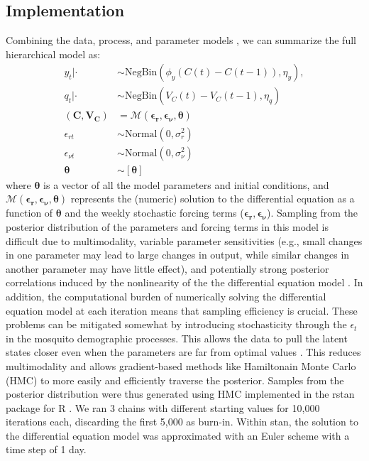 \documentclass[10pt,letterpaper]{article}
\begin{document}
\subsection*{Implementation}

Combining the data, process, and parameter models \cite{Berliner1996}, we can summarize the full hierarchical model as:
\begin{align}
y_t | \cdot & \sim \text{NegBin}(\phi_y (C(t) - C(t-1)), \eta_y),
\\
q_t | \cdot &\sim \text{NegBin}(V_{C}(t) - V_{C}(t-1), \eta_q)\\
(\mathbf{C}, \mathbf{V_C}) & = \mathcal{M}(\boldsymbol{\epsilon_r}, \boldsymbol{\epsilon_{\nu}},\boldsymbol{\theta})\\
\epsilon_{rt} & \sim \text{Normal}(0, \sigma^2_r)\\
\epsilon_{\nu t} & \sim \text{Normal}(0, \sigma^2_{\nu})\\
\boldsymbol{\theta} & \sim [\boldsymbol{\theta}]
\end{align}
where $\boldsymbol{\theta}$ is a vector of all the model parameters and initial conditions, and $\mathcal{M}(\boldsymbol{\epsilon_r}, \boldsymbol{\epsilon_{\nu}},\boldsymbol{\theta})$ represents the (numeric) solution to the differential equation as a function of $\boldsymbol{\theta}$ and the weekly stochastic forcing terms ($\boldsymbol{\epsilon_{r}}, \boldsymbol{\epsilon_{\nu}}$).
Sampling from the posterior distribution of the parameters and forcing terms in this model is difficult due to multimodality, variable parameter sensitivities (e.g., small changes in one parameter may lead to large changes in output, while similar changes in another parameter may have little effect), and potentially strong posterior correlations induced by the nonlinearity of the the differential equation model \cite{Reilly2005, Girolami2008, Calderhead2011}.
In addition, the computational burden of numerically solving the differential equation model at each iteration means that sampling efficiency is crucial.
These problems can be mitigated somewhat by introducing stochasticity through the $\epsilon_t$ in the mosquito demographic processes.
This allows the data to pull the latent states closer even when the parameters are far from optimal values \cite{Leander2014}.
This reduces multimodality and allows gradient-based methods like Hamiltonain Monte Carlo (HMC) to more easily and efficiently traverse the posterior.
Samples from the posterior distribution were thus generated using HMC implemented in the rstan package \cite{Carpenter2016, Rstan2017} for R \cite{R2016}. 
We ran 3 chains with different starting values for 10,000 iterations each, discarding the first 5,000 as burn-in.
Within stan, the solution to the differential equation model was approximated with an Euler scheme with a time step of 1 day.  
\end{document}

